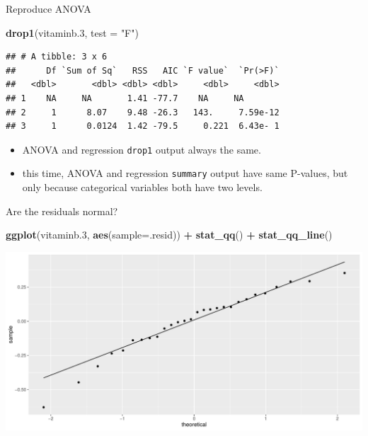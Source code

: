 \documentclass[
  ignorenonframetext,
]{beamer}
\newenvironment{Shaded}{\begin{snugshade}}{\end{snugshade}}
\newcommand{\DataTypeTok}[1]{\textcolor[rgb]{0.13,0.29,0.53}{#1}}
\newcommand{\FloatTok}[1]{\textcolor[rgb]{0.00,0.00,0.81}{#1}}
\newcommand{\KeywordTok}[1]{\textcolor[rgb]{0.13,0.29,0.53}{\textbf{#1}}}
\newcommand{\NormalTok}[1]{#1}
\newcommand{\OperatorTok}[1]{\textcolor[rgb]{0.81,0.36,0.00}{\textbf{#1}}}
\newcommand{\StringTok}[1]{\textcolor[rgb]{0.31,0.60,0.02}{#1}}
\providecommand{\tightlist}{%
  \setlength{\itemsep}{0pt}\setlength{\parskip}{0pt}}
\begin{document}
\begin{frame}[fragile]{Reproduce ANOVA}
\protect\hypertarget{reproduce-anova}{}

\small

\begin{Shaded}
\begin{Highlighting}[]
\KeywordTok{drop1}\NormalTok{(vitaminb}\FloatTok{.3}\NormalTok{, }\DataTypeTok{test =} \StringTok{"F"}\NormalTok{)}
\end{Highlighting}
\end{Shaded}

\begin{verbatim}
## # A tibble: 3 x 6
##      Df `Sum of Sq`   RSS   AIC `F value`  `Pr(>F)`
##   <dbl>       <dbl> <dbl> <dbl>     <dbl>     <dbl>
## 1    NA     NA       1.41 -77.7    NA     NA       
## 2     1      8.07    9.48 -26.3   143.     7.59e-12
## 3     1      0.0124  1.42 -79.5     0.221  6.43e- 1
\end{verbatim}

\normalsize

\begin{itemize}
\tightlist
\item
  ANOVA and regression \texttt{drop1} output always the same.
\item
  this time, ANOVA and regression \texttt{summary} output have same
  P-values, but only because categorical variables both have two levels.
\end{itemize}

\end{frame}

\begin{frame}[fragile]{Are the residuals normal?}
\protect\hypertarget{are-the-residuals-normal}{}

\begin{Shaded}
\begin{Highlighting}[]
\KeywordTok{ggplot}\NormalTok{(vitaminb}\FloatTok{.3}\NormalTok{, }\KeywordTok{aes}\NormalTok{(}\DataTypeTok{sample=}\NormalTok{.resid)) }\OperatorTok{+}\StringTok{ }
\StringTok{  }\KeywordTok{stat_qq}\NormalTok{() }\OperatorTok{+}\StringTok{ }\KeywordTok{stat_qq_line}\NormalTok{()}
\end{Highlighting}
\end{Shaded}

\includegraphics{slides_d29_files/figure-beamer/unnamed-chunk-204-1.pdf}

\end{frame}
\end{document}
